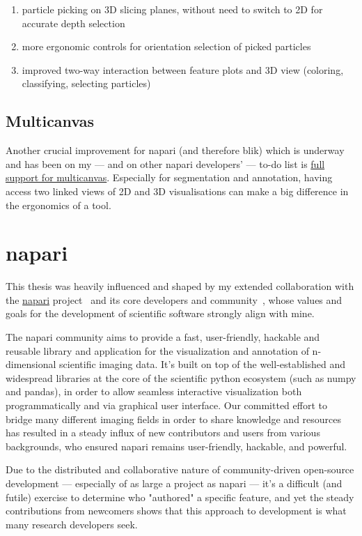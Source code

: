 \begin{enumerate}[noitemsep]
    \item particle picking on 3D slicing planes, without need to switch to 2D for accurate depth selection
    \item more ergonomic controls for orientation selection of picked particles
    \item improved two-way interaction between feature plots and 3D view (coloring, classifying, selecting particles)
\end{enumerate}

\subsection{Multicanvas}
Another crucial improvement for napari (and therefore blik) which is underway and has been on my --- and on other napari developers' --- to-do list is \href{https://github.com/napari/napari/issues/5348}{full support for multicanvas}.
Especially for segmentation and annotation, having access two linked views of 2D and 3D visualisations can make a big difference in the ergonomics of a tool.


\section{napari}

This thesis was heavily influenced and shaped by my extended collaboration with the \href{https://napari.org/}{napari} project~\cite{thenaparicommunityNapariMultidimensionalImage2024} and its core developers and community~\cite{thenaparicommunityCommunityNapari2024}, whose values and goals for the development of scientific software strongly align with mine.

The napari community aims to provide a fast, user-friendly, hackable and reusable library and application for the visualization and annotation of n-dimensional scientific imaging data.
It's built on top of the well-established and widespread libraries at the core of the scientific python ecosystem (such as numpy and pandas), in order to allow seamless interactive visualization both programmatically and via graphical user interface.
Our committed effort to bridge many different imaging fields in order to share knowledge and resources has resulted in a steady influx of new contributors and users from various backgrounds, who ensured napari remains user-friendly, hackable, and powerful.

Due to the distributed and collaborative nature of community-driven open-source development --- especially of as large a project as napari --- it's a difficult (and futile) exercise to determine who "authored" a specific feature, and yet the steady contributions from newcomers shows that this approach to development is what many research developers seek.

